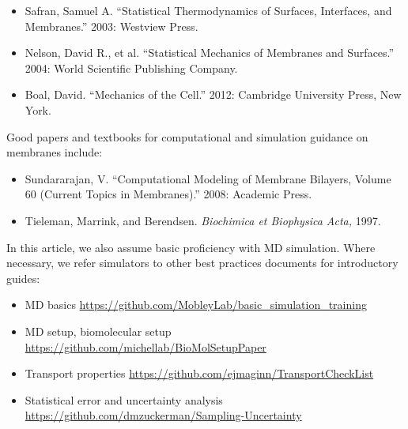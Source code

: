 \documentclass[9pt,bestpractices,pubversion]{livecoms}
\begin{document}
\begin{itemize}
	\item Safran, Samuel A. ``Statistical Thermodynamics of Surfaces, Interfaces, and Membranes.'' 2003: Westview Press.
	\item Nelson, David R., et al. ``Statistical Mechanics of Membranes and Surfaces.'' 2004: World Scientific Publishing Company.
	\item Boal, David. ``Mechanics of the Cell.'' 2012: Cambridge University Press, New York.
\end{itemize}

Good papers and textbooks for computational and simulation guidance on membranes include:

\begin{itemize}
	\item Sundararajan, V. ``Computational Modeling of Membrane Bilayers, Volume 60 (Current Topics in Membranes).'' 2008: Academic Press.
	\item Tieleman, Marrink, and Berendsen. \textit{Biochimica et Biophysica Acta,} 1997.
\end{itemize}

In this article, we also assume basic proficiency with MD simulation. Where necessary, we refer simulators to other best practices documents for introductory guides:

\begin{center}
	\begin{minipage}{\columnwidth}
		\centering
		\begin{itemize}
		\item MD basics \url{https://github.com/MobleyLab/basic_simulation_training}
		\item MD setup, biomolecular setup \url{https://github.com/michellab/BioMolSetupPaper}
		\item Transport properties \url{https://github.com/ejmaginn/TransportCheckList}
		\item Statistical error and uncertainty analysis \url{https://github.com/dmzuckerman/Sampling-Uncertainty}
		\end{itemize}
	\end{minipage}%
\end{center}

\end{document}
